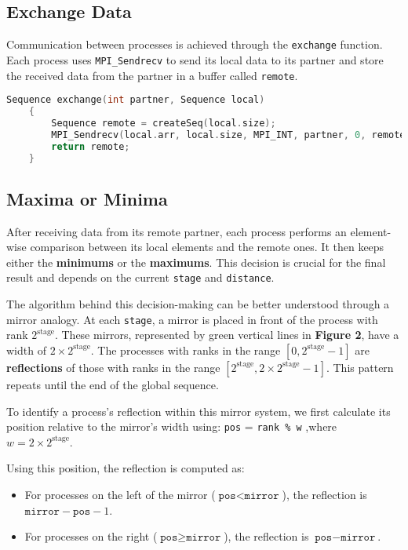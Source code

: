\documentclass[12pt]{article}
\begin{document}
\subsection{Exchange Data}
Communication between processes is achieved through the \texttt{exchange} function. Each process uses \texttt{MPI\_Sendrecv} to send its local data to its partner and store the received data from the partner in a buffer called \texttt{remote}.
\vspace{0.3cm}
\begin{lstlisting}[language=C]
    Sequence exchange(int partner, Sequence local)
    {
        Sequence remote = createSeq(local.size);
        MPI_Sendrecv(local.arr, local.size, MPI_INT, partner, 0, remote.arr, remote.size, MPI_INT, partner, 0, MPI_COMM_WORLD, MPI_STATUS_IGNORE);
        return remote;
    }
\end{lstlisting}
\newpage
\subsection{Maxima or Minima}
After receiving data from its remote partner, each process performs an element-wise comparison between its local elements and the remote ones. It then keeps either the \textbf{minimums} or the \textbf{maximums}. This decision is crucial for the final result and depends on the current \texttt{stage} and \texttt{distance}.

The algorithm behind this decision-making can be better understood through a mirror analogy. At each \texttt{stage}, a mirror is placed in front of the process with rank \( 2^{\text{stage}} \). These mirrors, represented by green vertical lines in \textbf{Figure 2}, have a width of \( 2 \times 2^{\text{stage}} \). The processes with ranks in the range \([0, 2^{\text{stage}} - 1]\) are \textbf{reflections} of those with ranks in the range \([2^{\text{stage}}, 2 \times 2^{\text{stage}} - 1]\). This pattern repeats until the end of the global sequence.

To identify a process’s reflection within this mirror system, we first calculate its position relative to the mirror’s width using: \texttt{pos} = \texttt{rank \% w} ,where \( w = 2 \times 2^{\text{stage}} \).

Using this position, the reflection is computed as:
\begin{itemize}
    \item For processes on the left of the mirror (\( \texttt{pos} < \texttt{mirror} \)), the reflection is \( \texttt{mirror} - \texttt{pos} - 1 \).
    \item For processes on the right (\( \texttt{pos} \geq \texttt{mirror} \)), the reflection is \( \texttt{pos} - \texttt{mirror} \).
\end{itemize}
\end{document}
